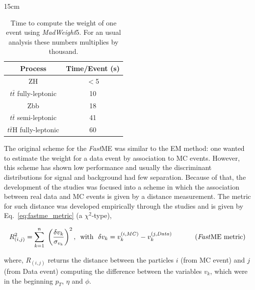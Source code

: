 \begin{table}[htbp]{15cm}
	\caption{Time to compute the weight of one event using \textit{MadWeight}5. For an usual analysis these numbers multiplies by thousand.}
	\begin{tabular}{c|c}
		\hline
		Process                    & Time/Event (s)\\
		\hline
		ZH                         & $<$5\\
		$t\bar{t}$ fully-leptonic  &   10\\
		Zbb                        &   18\\
		$t\bar{t}$ semi-leptonic   &   41\\
		$t\bar{t}$H fully-leptonic &   60\\
		\hline
	\end{tabular}
	\label{tab:mela_times}
\end{table}

The original scheme for the \textit{Fast}ME was similar to the EM method: one wanted to estimate the weight for a data event by association to MC events. However, this scheme has shown low performance and usually the discriminant distributions for signal and background had few separation. Because of that, the development of the studies was focused into a scheme in which the association between real data and MC events is given by a distance measurement. The metric for such distance was developed empirically through the studies and is given by Eq.~\ref{eq:fastme_metric} (a $\chi^{2}$-type),

\begin{equation}
R^{2}_{(i,j)} = \sum_{k=1}^{n}~ \left( \dfrac{\delta v_{k}}{\sigma_{v_{k}}} \right)^2,~~$with$~~\delta v_{k} = v_{k}^{(i,MC)}-v_{k}^{(j,Data)}
~~~~~~~~~~$(\textit{Fast}ME metric)$
\label{eq:fastme_metric}
\end{equation}

where, $R_{(i,j)}$ returns the distance between the particles $i$ (from MC event) and $j$ (from Data event) computing the difference between the variables $v_{k}$, which were in the beginning $p_{T}$, $\eta$ and $\phi$.
 
